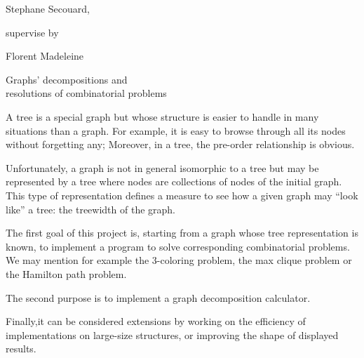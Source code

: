 \documentclass[a4paper, 11pt,french]{article}
\begin{document}
\noindent
{\small
 \begin{minipage}{0.42\linewidth}
 Stephane Secouard,

 supervise by

 Florent Madeleine
\end{minipage}
\hfill
\begin{minipage}{0.4\linewidth}
  Graphs' decompositions and \\ resolutions of combinatorial problems
\end{minipage}}
\bigskip


\begin{center}
  {\large {}}
\end{center}

\medskip
A tree is a special graph but whose structure is easier to handle in many situations than a graph. For example, it is easy to browse through all its nodes without forgetting any; Moreover, in a tree, the pre-order relationship is obvious.

Unfortunately, a graph is not in general isomorphic to a tree but may be represented by a tree where nodes are collections of nodes of the initial graph.  This type of representation defines a measure to see how a given graph may ``look like''  a tree: the treewidth of the graph.

The first goal of this project is, starting from a graph whose tree representation is known, to implement a program to solve corresponding combinatorial problems. We may mention for example the 3-coloring problem, the max clique problem or the Hamilton path problem.

The second purpose is to implement a graph decomposition calculator.

Finally,it can be considered extensions by working on the efficiency of implementations on large-size structures, or improving the shape of displayed results.
\end{document}
